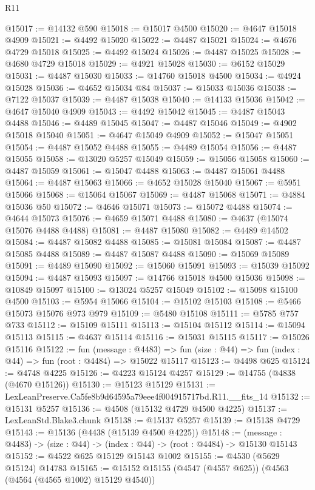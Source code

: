 \begin{lexlean}{R11}
\begin{coremodule}
@15017 := @14132 @590
@15018 := @15017 @4500
@15020 := @4647 @15018 @4909
@15021 := @4492 @15020
@15022 := @4487 @15021
@15024 := @4676 @4729 @15018
@15025 := @4492 @15024
@15026 := @4487 @15025
@15028 := @4680 @4729 @15018
@15029 := @4921 @15028
@15030 := @6152 @15029
@15031 := @4487 @15030
@15033 := @14760 @15018 @4500
@15034 := @4924 @15028
@15036 := @4652 @15034 @84
@15037 := @15033 @15036
@15038 := @7122 @15037
@15039 := @4487 @15038
@15040 := @14133 @15036
@15042 := @4647 @15040 @4909
@15043 := @4492 @15042
@15045 := @4487 @15043 @4488
@15046 := @4489 @15045
@15047 := @4487 @15046
@15049 := @4902 @15018 @15040
@15051 := @4647 @15049 @4909
@15052 := @15047 @15051
@15054 := @4487 @15052 @4488
@15055 := @4489 @15054
@15056 := @4487 @15055
@15058 := @13020 @5257 @15049
@15059 := @15056 @15058
@15060 := @4487 @15059
@15061 := @15047 @4488
@15063 := @4487 @15061 @4488
@15064 := @4487 @15063
@15066 := @4652 @15028 @15040
@15067 := @5951 @15066
@15068 := @15064 @15067
@15069 := @4487 @15068
@15071 := @4884 @15036 @50
@15072 := @4646 @15071
@15073 := @15072 @4488
@15074 := @4644 @15073
@15076 := @4659 @15071 @4488
@15080 := @4637 (@15074 @15076 @4488 @4488)
@15081 := @4487 @15080
@15082 := @4489 @14502
@15084 := @4487 @15082 @4488
@15085 := @15081 @15084
@15087 := @4487 @15085 @4488
@15089 := @4487 @15087 @4488
@15090 := @15069 @15089
@15091 := @4489 @15090
@15092 := @15060 @15091
@15093 := @15039 @15092
@15094 := @4487 @15093
@15097 := @14766 @15018 @4500 @15036
@15098 := @10849 @15097
@15100 := @13024 @5257 @15049
@15102 := @15098 @15100 @4500
@15103 := @5954 @15066
@15104 := @15102 @15103
@15108 := @5466 @15073 @15076 @973 @979
@15109 := @5480 @15108
@15111 := @5785 @757 @733
@15112 := @15109 @15111
@15113 := @15104 @15112
@15114 := @15094 @15113
@15115 := @4637 @15114
@15116 := @15031 @15115
@15117 := @15026 @15116
@15122 := fun (message : @4483) =>
  fun (size : @44) => fun (index : @44) => fun (root : @4484) => @15022 @15117
@15123 := @4498 @625
@15124 := @4748 @4225
@15126 := @4223 @15124 @4257
@15129 := @14755 (@4838 (@4670 @15126))
@15130 := @15123 @15129
@15131 := LexLeanPreserve.Ca5fe8b9d64595a79eee4f004915717bd.R11.__fits_14
@15132 := @15131 @5257
@15136 := @4508 (@15132 @4729 @4500 @4225)
@15137 := LexLeanStd.Blake3.chunk
@15138 := @15137 @5257
@15139 := @15138 @4729
@15143 := @15136 (@4438 (@15139 @4500 @4225))
@15148 := (message : @4483) -> (size : @44) -> (index : @44) -> (root : @4484) -> @15130 @15143
@15152 := @4522 @625 @15129 @15143 @1002
@15155 := @4530 (@5629 @15124) @14783
@15165 := @15152 @15155 (@4547 (@4557 @625)) (@4563 (@4564 (@4565 @1002) @15129 @4540))

\end{coremodule}
\end{lexlean}
